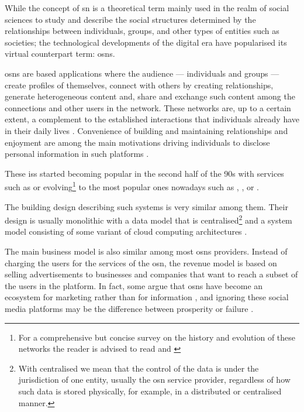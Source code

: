 \documentclass[showtrims,oldfontcommands]{kthesis}
\begin{document}
While the concept of \acl{sn} is a theoretical term mainly used in the realm of 
social sciences to study and describe the social structures determined by the relationships 
between individuals, groups, and other types of entities such as societies; the 
technological developments of the digital era have popularised its virtual counterpart 
term: \aclp{osn}.

\Acp{osn} are \Internet based applications where the audience --- individuals and 
groups --- create profiles of themselves, connect with others by creating relationships, 
generate heterogeneous content and, share and exchange such content among the connections 
and other users in the network. These networks are, up to a certain extent, a complement 
to the established interactions that individuals already have in their daily lives 
\cite{SubrahmanyamRWE08}. Convenience of building and maintaining relationships 
and enjoyment are among the main motivations driving individuals to disclose personal 
information in such platforms \cite{KrasnovaSKH10}.

These \acp{is} started becoming popular in the second half of the 90s 
with services such as \LiveJournal or \Friendster evolving\footnote{For a comprehensive 
but concise survey on the history and evolution of these networks the reader is 
advised to read \cite{boydE07} and \cite{HeidemannKP12}} to the most popular ones 
nowadays such as \Facebook, \LinkedIn, \Twitter or \GooglePlus.

The building design describing such systems is very similar among them. Their design 
is usually monolithic with a data model that is centralised\footnote{With centralised 
we mean that the control of the data is under the jurisdiction of one entity, usually 
the \ac{osn} service provider, regardless of how such data is stored physically, 
for example, in a distributed or centralised manner.} and a system model consisting 
of some variant of cloud computing architectures \cite{PallisZD11}. 

The main business model is also similar among most \acp{osn} providers. Instead 
of charging the users for the services of the \ac{osn}, the revenue model is based 
on selling advertisements to businesses and companies that want to reach a subset 
of the users in the platform. In fact, some argue that \acp{osn} have become an 
ecosystem for marketing rather than for information \cite{HannaRC11}, and ignoring 
these social media platforms may be the difference between prosperity or failure 
\cite{HarrisR09}.
\end{document}
